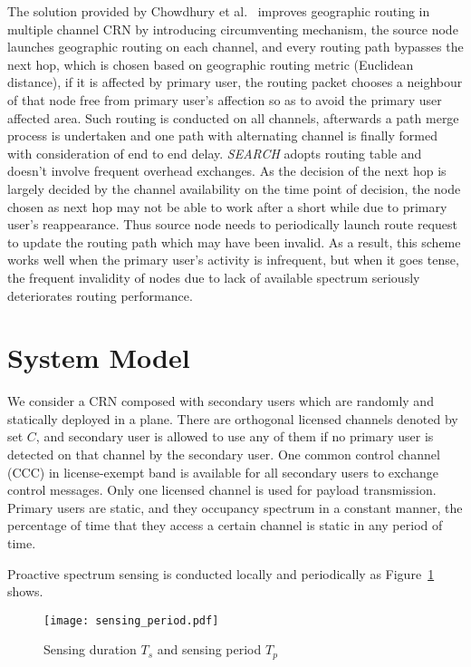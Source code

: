 The solution provided by Chowdhury et al.~\cite{search_geo_routing_chowdhury} improves geographic routing in multiple channel CRN by introducing circumventing mechanism, \ie 
the source node launches geographic routing on each channel, and every routing path bypasses the next hop, which is chosen based on geographic routing metric (\eg Euclidean distance), if it is affected by primary user, the routing packet chooses a neighbour of that node free from primary user's affection so as to avoid the primary user affected area.
Such routing is conducted on all channels, afterwards a path merge process is undertaken and one path with alternating channel is finally formed with consideration of end to end delay.
\textit{SEARCH} adopts routing table and doesn't involve frequent overhead exchanges.
%
As the decision of the next hop is largely decided by the channel availability on the time point of decision, the node chosen as next hop may not be able to work after a short while due to primary user's reappearance.
Thus source node needs to periodically launch route request to update the routing path which may have been invalid.
As a result, this scheme works well when the primary user's activity is infrequent, but when it goes tense, the frequent invalidity of nodes due to lack of available spectrum seriously deteriorates routing performance.



\section{System Model}

We consider a CRN composed with secondary users which are randomly and statically deployed in a plane.
There are orthogonal licensed channels denoted by set $C$, and secondary user is allowed to use any of them if no primary user is detected on that channel by the secondary user.
One common control channel (CCC) in license-exempt band is available for all secondary users to exchange control messages.
Only one licensed channel is used for payload transmission.
Primary users are static, and they occupancy spectrum in a constant manner, \eg the percentage of time that they access a certain channel is static in any period of time.


Proactive spectrum sensing is conducted locally and periodically as Figure~\ref{fig:sensing_period} shows. %
\begin{figure}[ht]
\centering
\texttt{[image: sensing\_period.pdf]}
\caption{Sensing duration $T_s$ and sensing period $T_p$}
\label{fig:sensing_period}
\end{figure}



